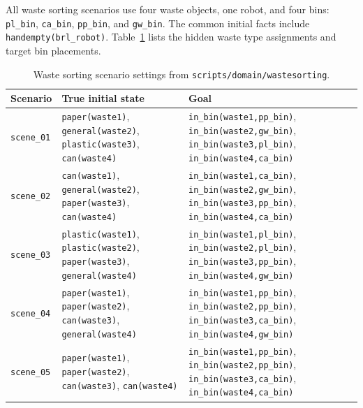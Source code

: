All waste sorting scenarios use four waste objects, one robot, and four bins: \texttt{pl\_bin}, \texttt{ca\_bin}, \texttt{pp\_bin}, and \texttt{gw\_bin}. The common initial facts include \texttt{handempty(brl\_robot)}. Table~\ref{tab:wastesorting_scenarios} lists the hidden waste type assignments and target bin placements.

\begin{table}[H]
\centering
\small
\caption{Waste sorting scenario settings from \texttt{scripts/domain/wastesorting}.}
\label{tab:wastesorting_scenarios}
\begin{tabularx}{\linewidth}{lXX}
\toprule
Scenario & True initial state & Goal \\
\midrule
\texttt{scene\_01} & \texttt{paper(waste1)}, \texttt{general(waste2)}, \texttt{plastic(waste3)}, \texttt{can(waste4)} & \texttt{in\_bin(waste1,pp\_bin)}, \texttt{in\_bin(waste2,gw\_bin)}, \texttt{in\_bin(waste3,pl\_bin)}, \texttt{in\_bin(waste4,ca\_bin)} \\
\texttt{scene\_02} & \texttt{can(waste1)}, \texttt{general(waste2)}, \texttt{paper(waste3)}, \texttt{can(waste4)} & \texttt{in\_bin(waste1,ca\_bin)}, \texttt{in\_bin(waste2,gw\_bin)}, \texttt{in\_bin(waste3,pp\_bin)}, \texttt{in\_bin(waste4,ca\_bin)} \\
\texttt{scene\_03} & \texttt{plastic(waste1)}, \texttt{plastic(waste2)}, \texttt{paper(waste3)}, \texttt{general(waste4)} & \texttt{in\_bin(waste1,pl\_bin)}, \texttt{in\_bin(waste2,pl\_bin)}, \texttt{in\_bin(waste3,pp\_bin)}, \texttt{in\_bin(waste4,gw\_bin)} \\
\texttt{scene\_04} & \texttt{paper(waste1)}, \texttt{paper(waste2)}, \texttt{can(waste3)}, \texttt{general(waste4)} & \texttt{in\_bin(waste1,pp\_bin)}, \texttt{in\_bin(waste2,pp\_bin)}, \texttt{in\_bin(waste3,ca\_bin)}, \texttt{in\_bin(waste4,gw\_bin)} \\
\texttt{scene\_05} & \texttt{paper(waste1)}, \texttt{paper(waste2)}, \texttt{can(waste3)}, \texttt{can(waste4)} & \texttt{in\_bin(waste1,pp\_bin)}, \texttt{in\_bin(waste2,pp\_bin)}, \texttt{in\_bin(waste3,ca\_bin)}, \texttt{in\_bin(waste4,ca\_bin)} \\
\bottomrule
\end{tabularx}
\end{table}
